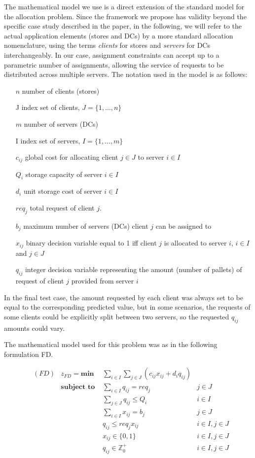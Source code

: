\documentclass[ijoc,sglanonrev]{informs4}
\begin{document}
The mathematical model we use is a direct extension of the standard model for the allocation problem. Since the framework we propose has validity beyond the specific case study described in the paper, in the following, we will refer to the actual application elements (stores and DCs) by a more standard allocation nomenclature, using the terms {\it clients} for stores and {\it servers} for DCs interchangeably. In our case, assignment constraints can accept up to a parametric number of assignments, allowing the service of requests to be distributed across multiple servers. The notation used in the model is as follows:

\begin{enumerate}
    \item[$n$] number of clients (stores)
    \item[J] index set of clients, $J=\{1, \ldots, n\}$
    \item[$m$] number of servers (DCs)
    \item[I] index set of servers, $I=\{1, \ldots, m\}$
    \item[$c_{ij}$] global cost for allocating client $j \in J$ to server $i \in I$
    \item[$Q_i$] storage capacity of server $i \in I$
    \item[$d_i$] unit storage cost of server $i \in I$
    \item[$req_j$] total request of client $j$.
    \item[$b_j$] maximum number of servers (DCs) client $j$ can be assigned to
    \item[$x_{ij}$] binary decision variable equal to 1 iff client $j$ is allocated to server $i$, $i \in I$ and $j \in J$
    \item[$q_{ij}$] integer decision variable representing the amount (number of pallets) of request of client $j$ provided from server $i$
\end{enumerate}

In the final test case, the amount requested by each client was always set to be equal to the corresponding predicted value, but in some scenarios, the requests of some clients could be explicitly split between two servers, so the requested $q_{ij}$ amounts could vary.

The mathematical model used for this problem was as in the following formulation FD.
   
\begin{align}
&(FD) & z_{FD} = \textbf{min } & \sum_{i \in I} \sum_{j \in J} ( c_{ij}x_{ij} + d_i q_{ij} ) \label{ALLobj}\\
& &  \textbf{subject to }
     & \sum_{i \in I} q_{ij} = req_j & j \in J  \label{ALLrequest}\\
& &  & \sum_{j \in J}q_{ij} \leq Q_i & i \in I \label{ALLcapacity}\\
& &  & \sum_{i \in I} x_{ij} = b_j & j \in J  \label{ALLnumserv}\\
& &  & q_{ij} \leq req_j x_{ij} & i \in I, j \in J \label{ALLcontin}\\
& &  & x_{ij} \in \{0,1\} & i\in I, j \in J \label{ALLx}\\
& &  & q_{ij} \in \mathbb{Z}^+_0 & i\in I, j \in J \label{ALLq}
\end{align}
\end{document}
